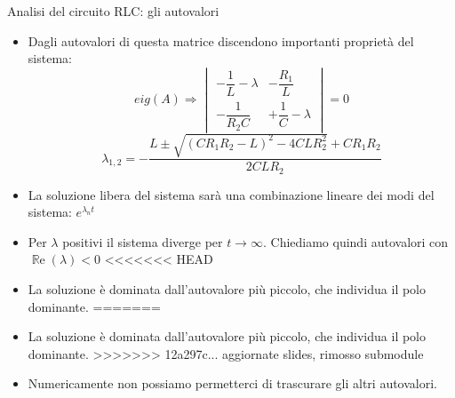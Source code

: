 \documentclass[aspectratio=169, 10pt, handout,usenames,dvipsnames]{beamer}
\begin{document}
\begin{frame}{Analisi del circuito RLC: gli autovalori}
    \begin{itemize}
        \item Dagli autovalori di questa matrice discendono importanti proprietà del sistema:
        \medskip
        \[
        eig(A) \Rightarrow  \begin{vmatrix} -\dfrac{1}{L}-\lambda & - \dfrac{R_1}{L}\\[1.5ex] -\dfrac{1}{R_2 C} & + \dfrac{1}{C}-\lambda \end{vmatrix} = 0
        \]
        \medskip
        \[
        \lambda_{1,2}  = -\frac{L \pm \sqrt{(C R_1 R_2 - L)^2 - 4CL R_2 ^2} + C R_1 R_2} {2 C L R_2}
        \]
        \medskip
        \item La soluzione libera del sistema sarà una combinazione lineare dei \alert{modi} del sistema: \( e^{\lambda_nt}\)
        \item Per $\lambda$ positivi il sistema diverge per $t \rightarrow \infty $. Chiediamo quindi autovalori con $\operatorname{\mathbb{R}e}(\lambda)<0$
<<<<<<< HEAD
        \item La soluzione è dominata dall'autovalore \alert{più piccolo}, che individua il polo dominante.
=======
        \item La soluzione è dominata dall'autovalore \alert{più piccolo}, che individua il polo dominante.
>>>>>>> 12a297c... aggiornate slides, rimosso submodule
        \item Numericamente non possiamo permetterci di trascurare gli altri autovalori.


 \end{itemize}
\end{frame}
\end{document}
